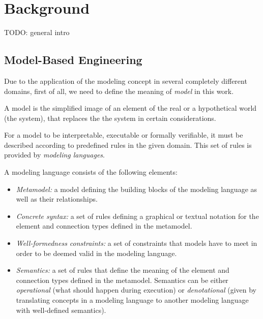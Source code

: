 \chapter{Background}
TODO: general intro
\section{Model-Based Engineering} \label{sec_backgrmbe}
Due to the application of the modeling concept in several completely different domains, first of all, we need to define the meaning of \textit{model} in this work.
\begin{definition}[Model]
	A model is the simplified image of an element of the real or a hypothetical world (the system), that replaces the the system in certain considerations.
\end{definition}

For a model to be interpretable, executable or formally verifiable, it must be described according to predefined rules in the given domain. This set of rules is provided by \textit{modeling languages}.
\begin{definition}
	A modeling language consists of the following elements:
	\begin{itemize}
		\item \emph{Metamodel:} a model defining the building blocks of the modeling language as well
		as their relationships.
		\item \emph{Concrete syntax:} a set of rules defining a graphical or textual notation for the
		element and connection types defined in the metamodel.
		\item \emph{Well-formedness constraints:} a set of constraints that models have to meet in order
		to be deemed valid in the modeling language.
		\item \emph{Semantics:} a set of rules that define the meaning of the element and connection
		types defined in the metamodel. Semantics can be either \textit{operational} (what should happen during execution) or \textit{denotational} (given by translating concepts in a modeling language to another modeling language with well-defined semantics).
	\end{itemize}
\end{definition}

